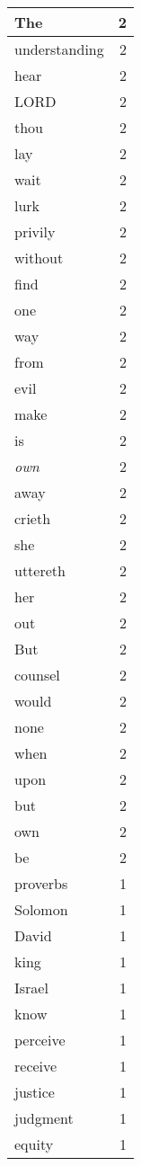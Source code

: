 \begin{center}
\begin{longtable}{l|r}
The & 2\\ \hline 
understanding & 2\\ \hline 
hear & 2\\ \hline 
LORD & 2\\ \hline 
thou & 2\\ \hline 
lay & 2\\ \hline 
wait & 2\\ \hline 
lurk & 2\\ \hline 
privily & 2\\ \hline 
without & 2\\ \hline 
find & 2\\ \hline 
one & 2\\ \hline 
way & 2\\ \hline 
from & 2\\ \hline 
evil & 2\\ \hline 
make & 2\\ \hline 
is & 2\\ \hline 
\emph{own} & 2\\ \hline 
away & 2\\ \hline 
crieth & 2\\ \hline 
she & 2\\ \hline 
uttereth & 2\\ \hline 
her & 2\\ \hline 
out & 2\\ \hline 
But & 2\\ \hline 
counsel & 2\\ \hline 
would & 2\\ \hline 
none & 2\\ \hline 
when & 2\\ \hline 
upon & 2\\ \hline 
but & 2\\ \hline 
own & 2\\ \hline 
be & 2\\ \hline 
proverbs & 1\\ \hline 
Solomon & 1\\ \hline 
David & 1\\ \hline 
king & 1\\ \hline 
Israel & 1\\ \hline 
know & 1\\ \hline 
perceive & 1\\ \hline 
receive & 1\\ \hline 
justice & 1\\ \hline 
judgment & 1\\ \hline 
equity & 1\\ \hline 

\end{longtable}
\end{center}
